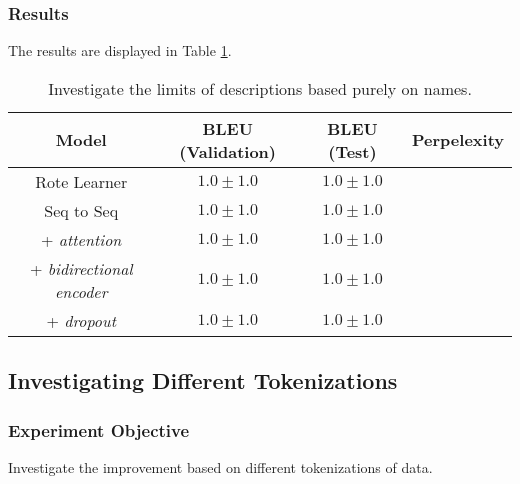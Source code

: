\subsubsection{Results} %

The results are displayed in Table \ref{table:name_baseline}.

\begin{table}[h!]
\begin{center}
\begin{tabular}{ c | c | c | c }
    Model                           {}  & BLEU (Validation)  & BLEU (Test)    & Perpelexity \\
    \hline
    Rote Learner                      & $1.0 \pm 1.0 $  & $1.0 \pm 1.0 $  & \\
    \hline
    Seq to Seq                        & $1.0 \pm 1.0 $  & $1.0 \pm 1.0 $  &  \\
    + \textit{attention}              & $1.0 \pm 1.0 $  & $1.0 \pm 1.0 $  & \\
    + \textit{bidirectional encoder}  & $1.0 \pm 1.0 $  & $1.0 \pm 1.0 $  & \\
    + \textit{dropout}                & $1.0 \pm 1.0 $  & $1.0 \pm 1.0 $  & \\
    \hline
\end{tabular}
\caption {Investigate the limits of descriptions based purely on names.}
\label{table:name_baseline}
\end{center}
\end{table}




\subsection{Investigating Different Tokenizations} %
\label{sub:investigating_different_tokenizations}

\subsubsection{Experiment Objective} %


Investigate the improvement based on different tokenizations of data.

